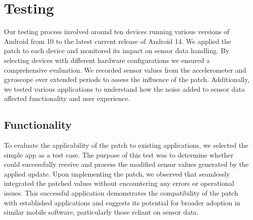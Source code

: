 \documentclass[11pt,
  oneside,openany,    %
]{scrreprt}
\begin{document}
\section{Testing}
\label{sec:testing}
Our testing process involved around ten devices running various versions of Android from 10 to the latest current release of Android 14.
We applied the patch to each device and monitored its impact on sensor data handling.
By selecting devices with different hardware configurations we ensured a comprehensive evaluation.
We recorded sensor values from the accelerometer and gyroscope over extended periods to assess the influence of the patch.
Additionally, we tested various applications to understand how the noise added to sensor data affected functionality and user experience.

\subsection{Functionality}
\label{subsec:functionality}
To evaluate the applicability of the patch to existing applications, we selected the simple app  as a test case.
The purpose of this test was to determine whether  could successfully receive and process the modified sensor values generated by the applied update.
Upon implementing the patch, we observed that  seamlessly integrated the patched values without encountering any errors or operational issues.
This successful application demonstrates the compatibility of the patch with established applications and suggests its potential for broader adoption in similar mobile software, particularly those reliant on sensor data.
\end{document}
